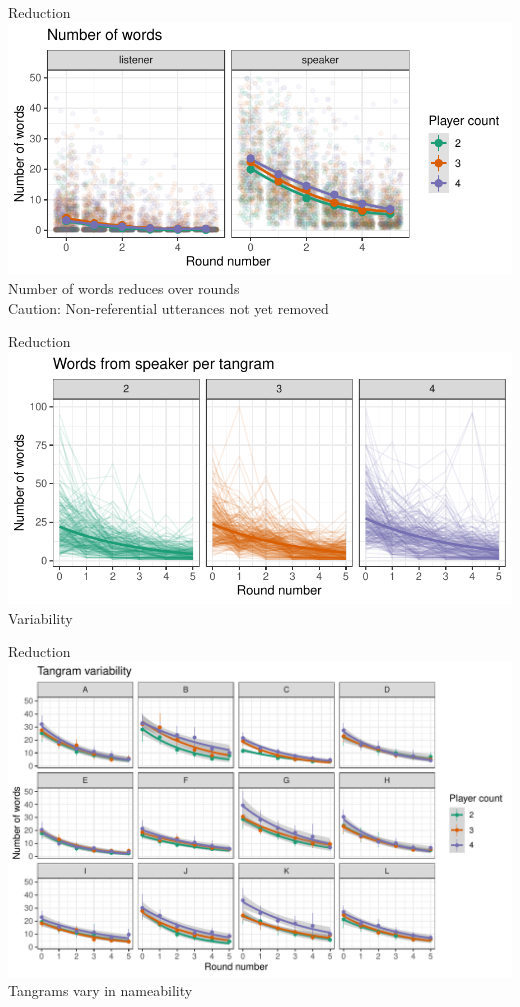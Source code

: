 \documentclass[ 12pt, xcolor=beamer,table,usenames,dvipsnames, ignorenonframetext, ngerman]{beamer}
\begin{document}
\begin{frame}{Reduction}
\includegraphics[width=\textwidth]{../images/words.pdf}
Number of words reduces over rounds\\
Caution: Non-referential utterances not yet removed
\end{frame}

\begin{frame}{Reduction}
	\includegraphics[width=\textwidth]{../images/words_lines.pdf}
Variability
\end{frame}

\begin{frame}{Reduction}
	\includegraphics[width=\textwidth]{../images/words_tangrams.pdf}
Tangrams vary in nameability
\end{frame}
\end{document}
